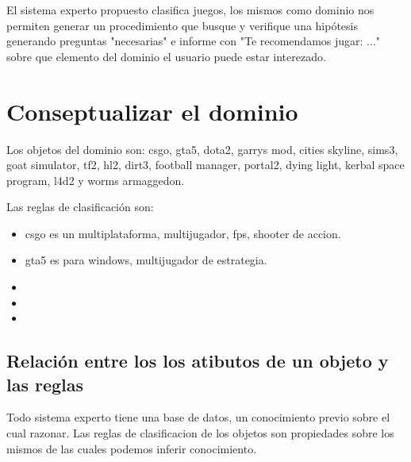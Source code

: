 \documentclass[11pt,oneside,a4paper]{article}
\begin{document}
El sistema experto propuesto clasifica juegos, los mismos como 
dominio nos permiten generar un procedimiento que busque y verifique
una hipótesis generando preguntas "necesarias" e informe con          %
"Te recomendamos jugar: ..." sobre que elemento del dominio el
usuario puede estar interezado.


\section{Conseptualizar el dominio}

Los objetos del dominio son:
csgo, 
gta5, 
dota2, 
garrys mod, 
cities skyline, 
sims3, 
goat simulator, 
tf2, 
hl2, 
dirt3, 
football manager, 
portal2, 
dying light, 
kerbal space program, 
l4d2 y 
worms armaggedon.

Las reglas de clasificación son:

\begin{itemize}
  \item csgo es un multiplataforma, multijugador, fps, shooter de accion. 
  \item gta5 es para windows, multijugador de estrategia.
  \item 
  \item 
  \item 
\end{itemize}

\subsection{Relación entre los los atibutos de un objeto y las reglas}


Todo sistema experto tiene una base de datos, un conocimiento previo sobre el
cual razonar. Las reglas de clasificacion de los objetos son propiedades
sobre los mismos de las cuales podemos inferir conocimiento.
\end{document}
